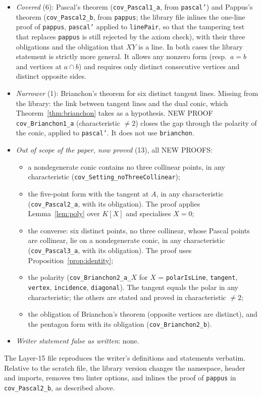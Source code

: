 \documentclass[11pt]{article}
\theoremstyle{remark}
\newcommand{\lean}[1]{\texttt{#1}}
\begin{document}
\begin{itemize}
\item \emph{Covered} (6): Pascal's theorem (\lean{cov\_Pascal1\_a}, from \lean{pascal'})
and Pappus's theorem (\lean{cov\_Pascal2\_b}, from \lean{pappus}; the library file inlines the
one-line proof of \lean{pappus}, \lean{pascal'} applied to \lean{linePair}, so that the tampering
test that replaces \lean{pappus} is still rejected by the axiom check), with their three
obligations and the obligation that $XY$ is a line. In both cases the library statement is strictly more general. It allows any nonzero form
(resp.\ $a=b$ and vertices at $a\cap b$) and requires only distinct consecutive vertices and distinct
opposite sides.
\item \emph{Narrower} (1): Brianchon's theorem for six distinct tangent lines. Missing from the
library: the link between tangent lines and the dual conic, which Theorem~\ref{thm:brianchon} takes as
a hypothesis. NEW PROOF \lean{cov\_Brianchon1\_a} (characteristic $\ne2$) closes
the gap through the polarity of the conic, applied to \lean{pascal'}. It does not use
\lean{brianchon}.
\item \emph{Out of scope of the paper, now proved} (13), all NEW PROOFS:
  \begin{itemize}
  \item a nondegenerate conic contains no three collinear points, in any characteristic
  (\lean{cov\_Setting\_noThreeCollinear});
  \item the five-point form with the tangent at $A$, in any characteristic
  (\lean{cov\_Pascal2\_a}, with its obligation). The proof applies Lemma~\ref{lem:poly}
  over $K[X]$ and specialises $X=0$;
  \item the converse: six distinct points, no three collinear, whose Pascal points are collinear, lie
  on a nondegenerate conic, in any characteristic (\lean{cov\_Pascal3\_a}, with its
  obligation). The proof uses Proposition~\ref{prop:identity};
  \item the polarity (\lean{cov\_Brianchon2\_a\_}$X$ for $X$ = \lean{polarIsLine}, \lean{tangent},
  \lean{vertex}, \lean{incidence}, \lean{diagonal}). The tangent equals the polar in any characteristic; the others are stated
  and proved in characteristic $\ne2$;
  \item the obligation of Brianchon's theorem (opposite vertices are distinct), and the pentagon form
  with its obligation (\lean{cov\_Brianchon2\_b}).
  \end{itemize}
\item \emph{Writer statement false as written}: none.
\end{itemize}
The Layer-15 file reproduces the writer's definitions and statements verbatim. Relative to the
scratch file, the library version changes the namespace, header and imports, removes two linter
options, and inlines the proof of \lean{pappus} in \lean{cov\_Pascal2\_b}, as described above.
\end{document}
